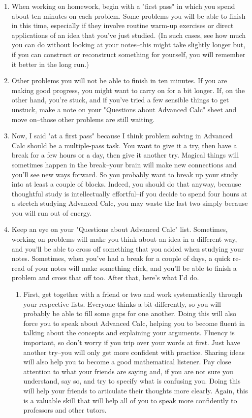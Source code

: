 \documentclass[12pt]{article}
\begin{document}
\begin{enumerate}
\begin{enumerate}
	\item When working on homework, begin with a "first pass" in which you spend about ten minutes on each problem. Some problems you will be able to finish in this time, especially if they involve routine warm-up exercises or direct applications of an idea that you've just studied. (In such cases, see how much you can do without looking at your notes--this might take slightly longer but, if you can construct or reconstruct something for yourself, you will remember it better in the long run.)
	\item Other problems you will not be able to finish in ten minutes. If you are making good progress, you might want to carry on for a bit longer. If, on the other hand, you're stuck, and if you've tried a few sensible things to get unstuck, make a note on your "Questions about Advanced Calc" sheet and move on--those other problems are still waiting.
	\item Now, I said "at a first pass" because I think problem solving in Advanced Calc should be a multiple-pass task. You want to give it a try, then have a break for a few hours or a day, then give it another try. Magical things will sometimes happen in the break--your brain will make new connections and you'll see new ways forward. So you probably want to break up your study into at least a couple of blocks. Indeed, you should do that anyway, because thoughtful study is intellectually effortful--if you decide to spend four hours at a stretch studying Advanced Calc, you may waste the last two simply because you will run out of energy.
	\item Keep an eye on your "Questions about Advanced Calc" list. Sometimes, working on problems will make you think about an idea in a different way, and you'll be able to cross off something that you added when studying your notes. Sometimes, when you've had a break for a couple of days, a quick re-read of your notes will make something click, and you'll be able to finish a problem and cross that off too. After that, here's what I'd do. 
		\begin{enumerate}
		\item First, get together with a friend or two and work systematically through your respective lists. Everyone thinks a bit differently, so you will probably be able to fill some gaps for one another. Doing this will also force you to speak about Advanced Calc, helping you to become fluent in talking about the concepts and explaining your arguments. Fluency is important, so don't worry if you trip over your words at first. Just have another try--you will only get more confident with practice. Sharing ideas will also help you to become a good mathematical listener. Pay close attention to what your friends are saying and, if you are not sure you understand, say so, and try to specify what is confusing you. Doing this will help your friends to articulate their thoughts more clearly. Again, this is a valuable skill that will help all of you to speak more confidently to professors and other tutors. 		

\end{enumerate}
\end{enumerate}
\end{enumerate}
\end{document}
